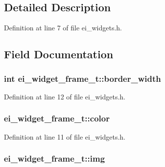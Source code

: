 \subsection{Detailed Description}


Definition at line 7 of file ei\-\_\-widgets.\-h.



\subsection{Field Documentation}
\hypertarget{structei__widget__frame__t_aa1dbc2d7c29610d5d778afd279137f80}{
\subsubsection[{border\-\_\-width}]{\setlength{\rightskip}{0pt plus 5cm}int ei\-\_\-widget\-\_\-frame\-\_\-t\-::border\-\_\-width}}\label{structei__widget__frame__t_aa1dbc2d7c29610d5d778afd279137f80}


Definition at line 12 of file ei\-\_\-widgets.\-h.

\hypertarget{structei__widget__frame__t_af0d87b04713786c206022aebb27c0647}{
\subsubsection[{color}]{ ei\-\_\-widget\-\_\-frame\-\_\-t\-::color}}\label{structei__widget__frame__t_af0d87b04713786c206022aebb27c0647}


Definition at line 11 of file ei\-\_\-widgets.\-h.

\hypertarget{structei__widget__frame__t_ad50d7cdd8bc27d8f5cf12395c7f6877c}{
\subsubsection[{img}]{ ei\-\_\-widget\-\_\-frame\-\_\-t\-::img}}\label{structei__widget__frame__t_ad50d7cdd8bc27d8f5cf12395c7f6877c}


